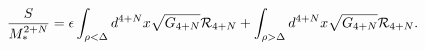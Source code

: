 \begin{equation}
{S\over M_*^{2+N}}= \epsilon \int_{ \rho< \Delta } d^{4+N} x 
\sqrt{G_{4+N}}   {\cal R}_{4+N}+ \int_{ \rho> \Delta}
 d^{4+N} x  \sqrt{G_{4+N}} {\cal R}_{4+N}.
\end{equation}

